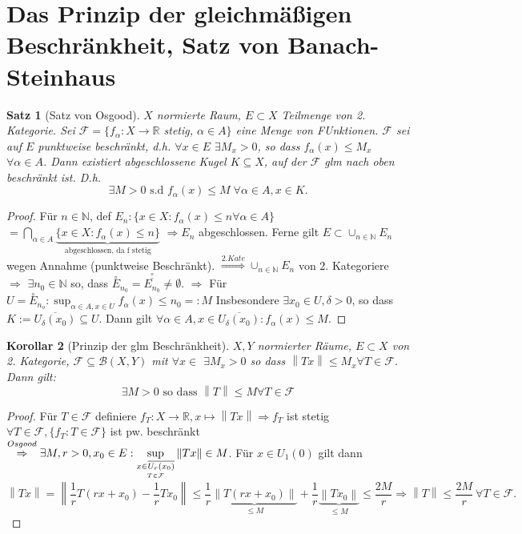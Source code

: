 \documentclass[ngerman]{report}
\theoremstyle{plain}%
\newtheorem{thm}{Satz}[chapter]
\newtheorem{cor}[thm]{Korollar}
\theoremstyle{definition}%
\theoremstyle{myStyle}
\newcommand{\R}{\mathbb{R}}
\newcommand{\N}{\mathbb{N}}
\newcommand{\BS}[1][X,Y]{\mathcal{B}(#1)} %
\newcommand{\norm}[1]{\left \|#1\right\| }
\newcommand{\df}[1][]{%
	\overset{#1}{\Rightarrow}
}
\newcommand{\disp}{\displaystyle}
\newcommand{\inner}[1]{\overset{\circ}{#1}}
\begin{document}
	\section{Das Prinzip der gleichmäßigen Beschränkheit, Satz von Banach-Steinhaus}
\newcommand{\F}{\mathcal{F}}

	\begin{thm}[Satz von Osgood]
		$X$ normierte Raum, $E \subset X$ Teilmenge von 2. Kategorie.	Sei $\mathcal{F} = \{f_\alpha: X\to \R$ stetig, $\alpha \in A\}$ eine Menge von FUnktionen. $\F$ sei auf $E$ punktweise beschränkt, d.h. $\forall x\in E$ $\exists M_x > 0$, so dass $f_\alpha (x) \leq M_x$ $\forall \alpha \in A$. Dann existiert abgeschlossene Kugel $K\subseteq X$, auf der $\F$ glm nach oben beschränkt ist. D.h.
		$$\exists M > 0 \text{ s.d } f_\alpha (x) \leq M \; \forall \alpha \in A, x\in K.$$
	\end{thm}
	
	\begin{proof}
		Für $n\in \N$, def $E_n : \{x\in X: f_\alpha(x) \leq n \forall \alpha \in A\}$
		$= \bigcap_{\alpha\in A} \underbrace{\{ x\in X: f_\alpha (x) \leq n\}}_{\text{abgeschlossen, da f stetig}}$
		$\df E_n$ abgeschlossen. Ferne gilt $E\subset \cup_{n\in\N} E_n$ wegen Annahme (punktweise Beschränkt). $\df[2. Kate] \cup_{n\in\N} E_n$ von 2. Kategoriere 
		$\df$ $\exists n_0 \in \N$ so, dass $\inner{E}_{n_0} = \inner{\overline{E_{n_0}}} \neq \emptyset.$
		$\df$ Für $U = \inner{E}_{n_o} :\sup_{\alpha \in A, x \in U} f_\alpha (x) \leq n_0 =: M$
		Insbesondere $\exists x_0 \in U, \delta > 0$, so dass $K:= \overline{U_\delta(x_0)} \subseteq U$. Dann gilt $\forall \alpha \in A, x\in \overline{U_\delta(x_0)}: f_\alpha (x) \leq M.$
	\end{proof}

	\begin{cor}[Prinzip der glm Beschränkheit]
		$X,Y$ normierter Räume, $E\subset X$ von 2. Kategorie, 
			$\F \subseteq \BS$ mit $\forall x \in $ $\exists M_x > 0$ so dass $\norm{Tx} \leq M_x \forall T \in \F$.
			Dann gilt: $$\exists M > 0 \text{ so dass } \norm{T} \leq M \forall T \in \F$$
	\end{cor}

	\begin{proof}
		Für $T \in \F$ definiere $f_T: X \to \R, x \mapsto \norm{Tx} \df f_T$ ist stetig $\forall T \in \F, \{f_T: T \in \F\}$ ist pw. beschränkt $\overset{Osgood}{\df} \exists M,r >0, x_0 \in E: \disp \sup_{\underset{T \in \F}{x \in \overline{U_r(x_0)}}} \norm{Tx} \in M$. Für $x \in U_1(0)$ gilt dann
		$$\norm{Tx}=\norm{\frac{1}{r}T(rx+x_0)-\frac{1}{r}Tx_0} \leq \frac{1}{r} \underbrace{\norm{T(rx+x_0)}}_{\leq M} + \frac{1}{r} \underbrace{\norm{Tx_0}}_{\leq M} \leq \frac{2M}{r} \df \norm{T} \leq \frac{2M}{r} ~\forall T \in \F.$$
	\end{proof}
\end{document}
